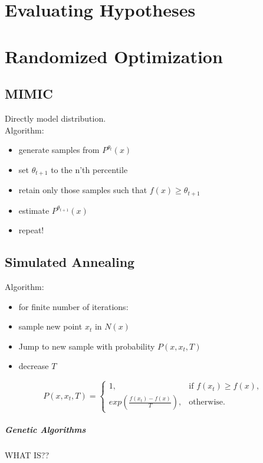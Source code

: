 \documentclass[11pt]{article}
\begin{document}
\section{Evaluating Hypotheses}

\section{Randomized Optimization}
\subsection{MIMIC}
Directly model distribution.\\
Algorithm:\\
\begin{itemize}
\item generate samples from $P^{\theta_t}(x)$
\item set $\theta_{t+1}$ to the n'th percentile
\item retain only those samples such that $f(x) \geq \theta_{t+1}$
\item estimate $P^{\theta_{t+1}}(x)$
\item repeat!
\end{itemize}

\subsection{Simulated Annealing}
Algorithm:\\
\begin{itemize}
\item for finite number of iterations:
\item sample new point $x_t$ in $N(x)$
\item Jump to new sample with probability $P(x, x_t, T)$
\item decrease $T$
\end{itemize}
$$P(x, x_t, T) =
    \begin{cases}
            1, &         \text{if } f(x_t) \geq f(x),\\
            exp(\frac{f(x_t)-f(x)}{T}), &         \text{otherwise}.
    \end{cases}
$$

\subparagraph{Genetic Algorithms}
WHAT IS??
\end{document}
